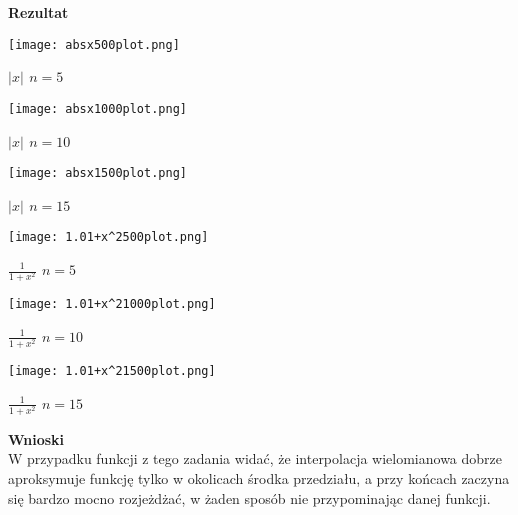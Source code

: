 \documentclass{article}
\begin{document}
\noindent \textbf{Rezultat}

\begin{center}
	\texttt{[image: absx500plot.png]}

	\textbf{$|x|$ $n=5$}
\end{center}

\begin{center}
	\texttt{[image: absx1000plot.png]}

	\textbf{$|x|$ $n=10$}
\end{center}

\begin{center}
	\texttt{[image: absx1500plot.png]}

	\textbf{$|x|$ $n=15$}
\end{center}

\begin{center}
	\texttt{[image: 1.01+x^2500plot.png]}

	\textbf{$\frac{1}{1+x^2}$ $n=5$}
\end{center}

\begin{center}
	\texttt{[image: 1.01+x^21000plot.png]}

	\textbf{$\frac{1}{1+x^2}$ $n=10$}
\end{center}

\begin{center}
	\texttt{[image: 1.01+x^21500plot.png]}

	\textbf{$\frac{1}{1+x^2}$ $n=15$}
\end{center}

\noindent \textbf{Wnioski} \\
W przypadku funkcji z tego zadania widać, że interpolacja wielomianowa
dobrze aproksymuje funkcję tylko w okolicach środka przedziału, a przy
końcach zaczyna się bardzo mocno rozjeżdżać, w żaden sposób nie
przypominając danej funkcji.
\end{document}
